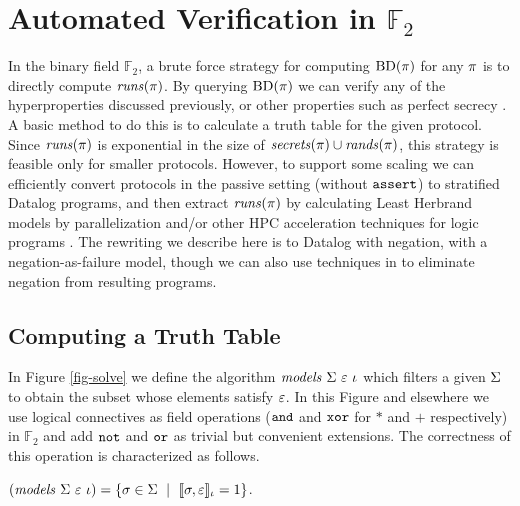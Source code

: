 \section{Automated Verification in $\mathbb{F}_2$}
\label{section-bruteforce}

In the binary field $\mathbb{F}_2$, a brute force strategy for computing
$\mathrm{BD}(\pi)$ for any $\pi$ is to directly compute
$\mathit{runs}(\pi)$. By querying $\mathrm{BD}(\pi)$ we can verify any of the
hyperproperties discussed previously, or other properties such as
perfect secrecy \cite{barthe2019probabilistic}.  A basic method to do this is
to calculate a truth table for the given protocol. Since
$\mathit{runs}(\pi)$ is exponential in
the size of $\mathit{secrets}(\pi) \cup \mathit{rands}(\pi)$, this strategy is
feasible only for smaller protocols. However, to support some
scaling we can efficiently
convert protocols in the passive setting (without $\texttt{assert}$) to
stratified Datalog programs, and then extract $\mathit{runs}(\pi)$ by
calculating Least Herbrand models by parallelization and/or other HPC
acceleration techniques for logic programs \cite{aspis2018linear}.
The rewriting we describe here is to Datalog with negation, with a
negation-as-failure model, though we can also use techniques in
\cite{sakama2017linear} to eliminate negation from resulting programs.

\subsection{Computing a Truth Table}

In Figure \ref{fig-solve} we define the algorithm
$\mathit{models}\ \Sigma\ \varepsilon\ \iota$ which filters a given $\Sigma$ to obtain
the subset whose elements satisfy $\varepsilon$. In this Figure and elsewhere
we use logical connectives as field operations ($\texttt{and}$ and $\texttt{xor}$
for $*$ and $+$ respectively) in $\mathbb{F}_2$ and add $\texttt{not}$ and
$\texttt{or}$ as trivial but convenient extensions. The correctness of this
operation is characterized as follows.
\begin{lemma}
  \label{lemma-solves}
  $(\mathit{models}\ \Sigma\ \varepsilon\ \iota) = \{ \sigma \in \Sigma \ \mid\ \llbracket \sigma,\varepsilon \rrbracket_{\iota} = 1 \}$.
\end{lemma}

\solvefig

